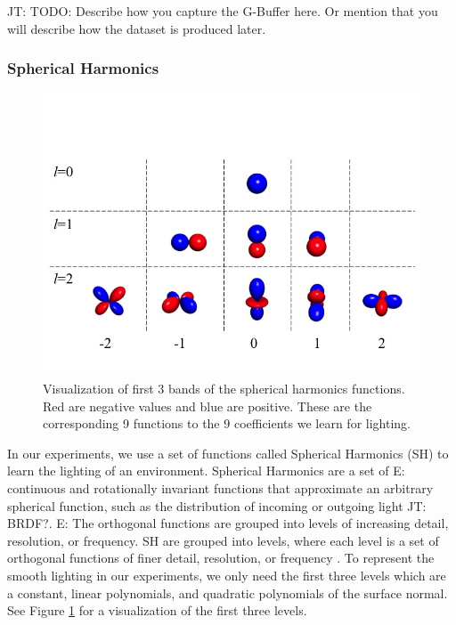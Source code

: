 \documentclass[10pt,twocolumn,letterpaper]{article}
\newcommand{\tompson}[1]{{\color{green} JT: #1}}
\newcommand{\edit}[1]{{\color{red} E: #1}}
\begin{document}
\tompson{TODO: Describe how you capture the G-Buffer here. Or mention that you will describe how the dataset is produced later.}

\subsubsection{Spherical Harmonics}
\begin{figure}[h!]
\centering
\includegraphics[width=1.0\columnwidth]{./assets/SH_Fig.jpg}
\caption{Visualization of first 3 bands of the spherical harmonics functions. Red are negative values and blue are positive. These are the corresponding 9 functions to the 9 coefficients we learn for lighting.}
\label{fig:SHBands01}
\end{figure}
In our experiments, we use a set of functions called Spherical Harmonics (SH) to learn the lighting of an environment. Spherical Harmonics are a set of \edit{continuous and rotationally invariant} functions that approximate an arbitrary spherical function, such as the distribution of incoming or outgoing light \cite{Ramamoorthi:2001:ERI:383259.383317} \tompson{BRDF?}. \edit{The orthogonal functions are grouped into levels of increasing detail, resolution, or frequency.} SH are grouped into levels, where each level is a set of orthogonal functions of finer detail, resolution, or frequency \cite{Shreiner:2013:OPG:2544032}.  To represent the smooth lighting in our experiments, we only need the first three levels which are a constant, linear polynomials, and quadratic polynomials of the surface normal. See Figure \ref{fig:SHBands01} for a visualization of the first three levels.%
\end{document}
